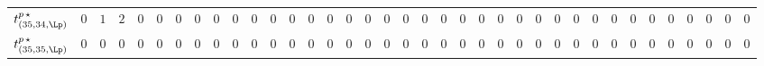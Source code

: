 \begin{tabular}{r|rrrrrrrrrrrrrrrrrrrrrrrrrrrrrrrrrrrr}
  $t^{p \, \star}_{(35,34,\Lp)}$ & $0$ & $1$ & $2$ & $0$ & $0$ & $0$ & $0$ & $0$ & $0$ & $0$ & $0$ & $0$ & $0$ & $0$ & $0$ & $0$ & $0$ & $0$ & $0$ & $0$ & $0$ & $0$ & $0$ & $0$ & $0$ & $0$ & $0$ & $0$ & $0$ & $0$ & $0$ & $0$ & $0$ & $0$ & $0$ & $0$ \\
  $t^{p \, \star}_{(35,35,\Lp)}$ & $0$ & $0$ & $0$ & $0$ & $0$ & $0$ & $0$ & $0$ & $0$ & $0$ & $0$ & $0$ & $0$ & $0$ & $0$ & $0$ & $0$ & $0$ & $0$ & $0$ & $0$ & $0$ & $0$ & $0$ & $0$ & $0$ & $0$ & $0$ & $0$ & $0$ & $0$ & $0$ & $0$ & $0$ & $0$ & $0$ \\
\end{tabular}
